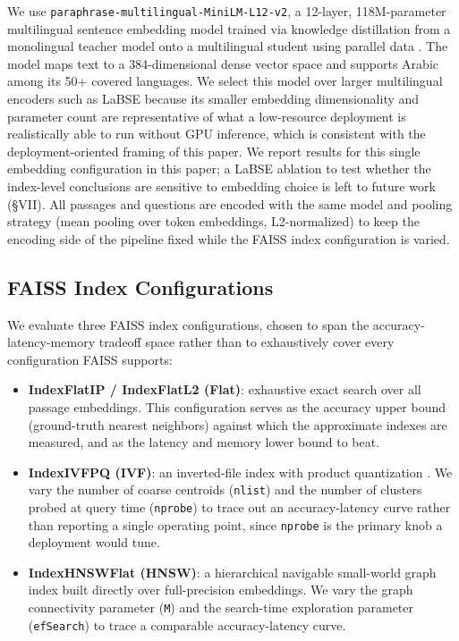 \documentclass[conference]{IEEEtran}
\begin{document}
We use \texttt{paraphrase-\allowbreak multilingual-\allowbreak MiniLM-\allowbreak L12-v2}, a 12-layer, 118M-parameter multilingual sentence embedding model trained via knowledge distillation from a monolingual teacher model onto a multilingual student using parallel data \cite{reimers2020making}. The model maps text to a 384-dimensional dense vector space and supports Arabic among its 50+ covered languages. We select this model over larger multilingual encoders such as LaBSE \cite{feng2022language} because its smaller embedding dimensionality and parameter count are representative of what a low-resource deployment is realistically able to run without GPU inference, which is consistent with the deployment-oriented framing of this paper. We report results for this single embedding configuration in this paper; a LaBSE ablation to test whether the index-level conclusions are sensitive to embedding choice is left to future work (\S VII). All passages and questions are encoded with the same model and pooling strategy (mean pooling over token embeddings, L2-normalized) to keep the encoding side of the pipeline fixed while the FAISS index configuration is varied.

\subsection{FAISS Index Configurations}

We evaluate three FAISS \cite{johnson2019billion} index configurations, chosen to span the accuracy-latency-memory tradeoff space rather than to exhaustively cover every configuration FAISS supports:

\begin{itemize}
\item \textbf{IndexFlatIP / IndexFlatL2 (Flat)}: exhaustive exact search over all passage embeddings. This configuration serves as the accuracy upper bound (ground-truth nearest neighbors) against which the approximate indexes are measured, and as the latency and memory lower bound to beat.
\item \textbf{IndexIVFPQ (IVF)}: an inverted-file index with product quantization \cite{jegou2011product}. We vary the number of coarse centroids (\texttt{nlist}) and the number of clusters probed at query time (\texttt{nprobe}) to trace out an accuracy-latency curve rather than reporting a single operating point, since \texttt{nprobe} is the primary knob a deployment would tune.
\item \textbf{IndexHNSWFlat (HNSW)}: a hierarchical navigable small-world graph index \cite{malkov2018hnsw} built directly over full-precision embeddings. We vary the graph connectivity parameter (\texttt{M}) and the search-time exploration parameter (\texttt{efSearch}) to trace a comparable accuracy-latency curve.
\end{itemize}
\end{document}
